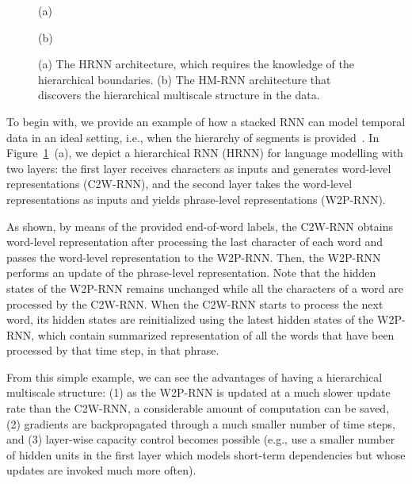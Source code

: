 \documentclass{article} %
\begin{document}
\begin{figure}[t]
\begin{minipage}{1.\columnwidth}
     \end{minipage}
     \begin{minipage}{1.\columnwidth}
         \begin{minipage}{0.48\columnwidth}
             \centering
             (a)
         \end{minipage}
         \hfill
         \begin{minipage}{0.48\columnwidth}
             \centering
             (b)
         \end{minipage}
     \end{minipage}
     \caption{(a) The HRNN architecture, which requires the knowledge of the hierarchical boundaries.
              (b) The HM-RNN architecture that discovers the hierarchical multiscale structure in the data.}
     \label{fig:motivation} 
\end{figure}

To begin with, we provide an example of how a stacked RNN can model
temporal data in an ideal setting, 
i.e., when the hierarchy of segments is provided~\citep{sordoni2015hierarchical,ling2015character}. 
In Figure~\ref{fig:motivation}~(a), we depict a hierarchical RNN (HRNN) for language modelling with two layers:
the first layer receives characters as inputs and generates word-level
representations (C2W-RNN), and the second layer takes the word-level
representations as inputs and yields phrase-level representations
(W2P-RNN).

As shown, by means of the provided end-of-word labels, the C2W-RNN obtains
word-level representation after processing the last character of each word
and passes the word-level representation to the W2P-RNN. Then, the W2P-RNN
performs an update of the phrase-level representation. Note that the hidden
states of the W2P-RNN remains unchanged while all the characters of a word are
processed by the C2W-RNN. When the C2W-RNN starts to process the next word,
its hidden states are reinitialized using the latest hidden states of the W2P-RNN,
which contain summarized representation of all the words that have been
processed by that time step, in that phrase. 

From this simple example, we can see the
advantages of having a hierarchical multiscale structure: (1) as the W2P-RNN
is updated at a much slower update rate than the C2W-RNN, a considerable
amount of computation can be saved, (2) gradients are backpropagated through
a much smaller number of time steps, and (3) layer-wise capacity control
becomes possible (e.g., use a smaller number of hidden units in the first
layer which models short-term dependencies but whose updates are invoked much more often).
\end{document}
